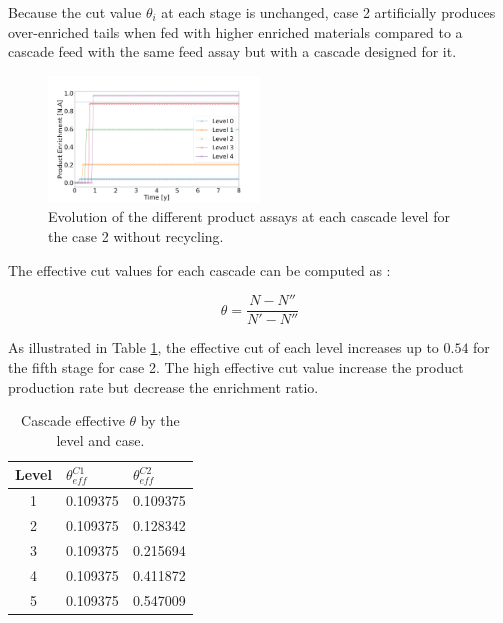 \documentclass{anstrans}
\begin{document}
Because the cut value $\theta_i$ at each stage is unchanged, case 2 artificially
produces over-enriched tails when fed with higher enriched materials compared
to a cascade feed with the same feed assay but with a cascade designed for it.
\begin{figure}[ht] %
  \centering
  \includegraphics[width=0.5\textwidth]{assay_case_2_no_rec.png}
  \caption{Evolution of the different product assays at each cascade level for
  the case 2 without recycling. }\label{fig:assay_c2_nr}
\end{figure}


The effective cut values for each cascade can be computed as :

\begin{equation}\label{eq:theta_eff}
    \theta = \dfrac{N - N''}{N'-N''}
\end{equation}

As illustrated in Table \ref{tab:cascade_theta}, the effective cut
of each level increases up to $0.54$ for the fifth stage for case 2. The high
effective cut value increase the product production rate but decrease the
enrichment ratio.
\begin{table}[htb]
\centering
\caption{Cascade effective $\theta$ by the level and case.}
\begin{tabular}{cll}
\toprule

Level   &  $\theta_{eff}^{C1}$   & $\theta_{eff}^{C2}$ \\
\midrule
1       & 0.109375               & 0.109375     \\
2       & 0.109375               & 0.128342     \\
3       & 0.109375               & 0.215694     \\
4       & 0.109375               & 0.411872     \\
5       & 0.109375               & 0.547009     \\

\bottomrule
\end{tabular}

  \label{tab:cascade_theta}
\end{table}
\end{document}
